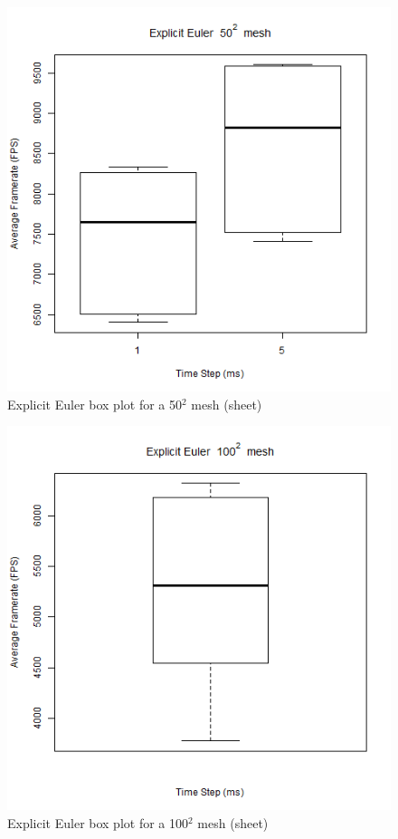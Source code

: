    \begin{figure}
    \begin{center}
      \includegraphics[scale=.9]{Figures/sheet_ee_50_box}
    \end{center}
    \caption{Explicit Euler box plot for a 50$^{2}$ mesh (sheet)}
    \label{fig:ee box 50 sheet}
  \end{figure}
  
      \begin{figure}
    \begin{center}
      \includegraphics[scale=.9]{Figures/sheet_ee_100_box}
    \end{center}
    \caption{Explicit Euler box plot for a 100$^{2}$ mesh (sheet)}
    \label{fig:ee box 100 sheet}
  \end{figure}
  
